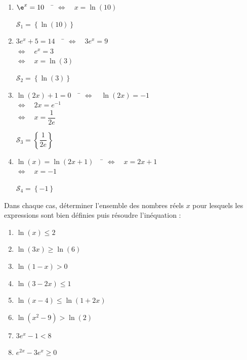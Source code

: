 \documentclass[a4paper,11pt,exos]{nsi} %
\begin{document}
\newpage
\textcolor{UGLiBlue}{
    \begin{multicols}{2}
        \begin{enumerate}
            \item \begin{tabbing}
                $\e^{x}=10\quad$ \= $\iff \quad x=\ln(10)$
            \end{tabbing}
            $\mathcal{S}_1=\left\{\ln(10)\right\}$
            \item \begin{tabbing}
                $3e^x+5=14\quad$ \= $\iff \quad 3e^x=9$\\
                \> $\iff \quad e^x=3$\\
                \> $\iff \quad x=\ln(3)$
            \end{tabbing}
            $\mathcal{S}_2=\left\{\ln(3)\right\}$
            \vfill\null
            \columnbreak
            \item \begin{tabbing}
                $\ln(2x)+1=0\quad$ \= $\iff \quad \ln(2x)=-1$\\
                \> $\iff \quad 2x=e^{-1}$\\
                \> $\iff \quad x=\dfrac{1}{2e}$
            \end{tabbing}
            $\mathcal{S}_3=\left\{\dfrac{1}{2e}\right\}$
            \item \begin{tabbing}
                $\ln(x)=\ln(2x+1)\quad$ \= $\iff \quad x=2x+1$\\
                \> $\iff \quad x=-1$
            \end{tabbing}
            $\mathcal{S}_4=\left\{-1\right\}$
        \end{enumerate}
    \end{multicols}
}

\exo{}
Dans chaque cas, déterminer l'ensemble des nombres réels $x$ pour lesquels les expressions sont bien définies puis résoudre l'inéquation :
\begin{multicols}{4}
    \begin{enumerate}
        \item $\ln(x)\leqslant 2$
        \item $\ln(3x)\geqslant \ln(6)$
        \item $\ln(1-x)> 0$
        \item $\ln(3-2x)\leqslant 1$
        \item $\ln(x-4)\leqslant \ln(1+2x)$
        \item $\ln(x^2-9)>\ln(2)$
        \item $3e^x-1<8$
        \item $e^{2x}-3e^x\geqslant 0$
    \end{enumerate}
\end{multicols}
\end{document}
